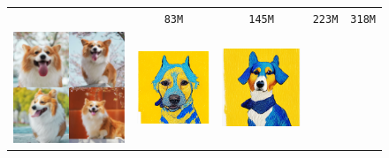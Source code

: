 \begin{figure}[!ht]
\begin{tabular}[t]{c c c c c}
    &  \texttt{83M} &  \texttt{145M} &  \texttt{223M} &  \texttt{318M} \\
    \multirow[t]{3}{*}{
    \includegraphics[width=0.3\linewidth]{cp2/figures/dreambooth/dog/dog.pdf}
    } &
    \includegraphics[width=\xwidth]{cp2/figures/dreambooth/dog/c224_checkpoint_99.png} &
    \includegraphics[width=\xwidth]{cp2/figures/dreambooth/dog/c256_checkpoint_99.png} &

\end{tabular}
\end{figure}
